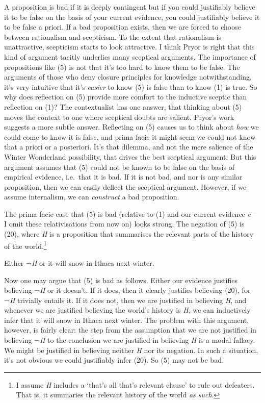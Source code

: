 \documentclass[
  11pt,
  letterpaper,
  DIV=11,
  numbers=noendperiod,
  twoside]{scrartcl}
\providecommand{\tightlist}{%
  \setlength{\itemsep}{0pt}\setlength{\parskip}{0pt}}
\begin{document}
A proposition is bad if it is deeply contingent but if you could
justifiably believe it to be false on the basis of your current
evidence, you could justifiably believe it to be false a priori. If a
bad proposition exists, then we are forced to choose between rationalism
and scepticism. To the extent that rationalism is unattractive,
scepticism starts to look attractive. I think Pryor is right that this
kind of argument tacitly underlies many sceptical arguments. The
importance of propositions like (5) is not that it's too hard to know
them to be false. The arguments of those who deny closure principles for
knowledge notwithstanding, it's very intuitive that it's \emph{easier}
to know (5) is false than to know (1) is true. So why does reflection on
(5) provide more comfort to the inductive sceptic than reflection on
(1)? The contextualist has one answer, that thinking about (5) moves the
context to one where sceptical doubts are salient. Pryor's work suggests
a more subtle answer. Reflecting on (5) causes us to think about
\emph{how} we could come to know it is false, and prima facie it might
seem we could not know that a priori or a posteriori. It's that dilemma,
and not the mere salience of the Winter Wonderland possibility, that
drives the best sceptical argument. But this argument assumes that (5)
could not be known to be false on the basis of empirical evidence,
i.e.~that it is bad. If it is not bad, and nor is any similar
proposition, then we can easily deflect the sceptical argument. However,
if we assume internalism, we can \emph{construct} a bad proposition.

The prima facie case that (5) is bad (relative to (1) and our current
evidence \emph{e} -- I omit these relativisations from now on) looks
strong. The negation of (5) is (20), where \emph{H} is a proposition
that summarises the relevant parts of the history of the
world.\footnote{I assume \emph{H} includes a `that's all that's relevant
  clause' to rule out defeaters. That is, it summaries the relevant
  history of the world \emph{as such}.}

\begin{description}
\tightlist
\item[(20)]
Either ¬\emph{H} or it will snow in Ithaca next winter.
\end{description}

Now one may argue that (5) is bad as follows. Either our evidence
justifies believing ¬\emph{H} or it doesn't. If it does, then it clearly
justifies believing (20), for ¬\emph{H} trivially entails it. If it does
not, then we are justified in believing \emph{H}, and whenever we are
justified believing the world's history is \emph{H}, we can inductively
infer that it will snow in Ithaca next winter. The problem with this
argument, however, is fairly clear: the step from the assumption that we
are not justified in believing ¬\emph{H} to the conclusion we are
justified in believing \emph{H} is a modal fallacy. We might be
justified in believing neither \emph{H} nor its negation. In such a
situation, it's not obvious we could justifiably infer (20). So (5) may
not be bad.
\end{document}
